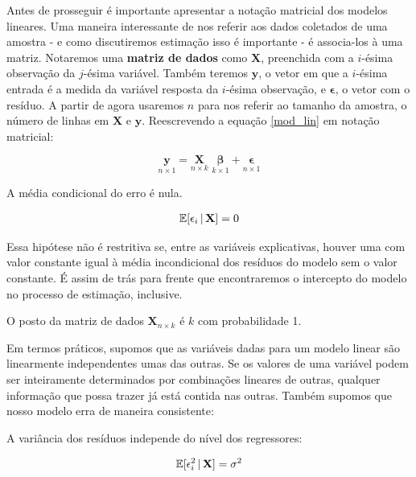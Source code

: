 Antes de prosseguir é importante apresentar a notação matricial dos modelos lineares. Uma maneira interessante de nos referir aos dados coletados de uma amostra - e como discutiremos estimação isso é importante - é associa-los à uma matriz. Notaremos uma \textbf{matriz de dados} como $\mathbf{X}$, preenchida com a $i$-ésima observação da $j$-ésima variável. Também teremos $\mathbf{y}$, o vetor em que a $i$-ésima entrada é a medida da variável resposta da $i$-ésima observação, e $\mathbf{\epsilon}$, o vetor com o resíduo. A partir de agora usaremos $n$ para nos referir ao tamanho da amostra, o número de linhas em $\mathbf{X}$ e $\mathbf{y}$. Reescrevendo a equação \ref{mod_lin} em notação matricial:

\begin{equation}
    \underset{n \times 1}{\mathbf{y}} = \underset{n \times k}{\mathbf{X}} \,\, \underset{k \times 1}{\boldsymbol{\beta}}   + \underset{n \times 1}{\boldsymbol{\epsilon}}
\end{equation}



\begin{hipotese}
A média condicional do erro é nula.

\begin{align}
    \mathbb{E}[\epsilon_i \, | \, \mathbf{X}] = 0
\end{align}

Essa hipótese não é restritiva se, entre as variáveis explicativas, houver uma com valor constante igual à média incondicional dos resíduos do modelo sem o valor constante. É assim de trás para frente que encontraremos o intercepto do modelo no processo de estimação, inclusive. 

\end{hipotese}

\begin{hipotese}
O posto da matriz de dados $\mathbf{X}_{n \times k}$ é $k$ com probabilidade 1.
\end{hipotese}

Em termos práticos, supomos que as variáveis dadas para um modelo linear são linearmente independentes umas das outras. Se os valores de uma variável podem ser inteiramente determinados por combinações lineares de outras, qualquer informação que possa trazer já está contida nas outras. Também supomos que nosso modelo erra de maneira consistente:

\begin{hipotese}[Homocedasticidade]
A variância dos resíduos independe do nível dos regressores:

\begin{align}
    \mathbb{E}[\epsilon_i^2\, |\, \mathbf{X} ] = \sigma^2
\end{align}


\end{hipotese}

